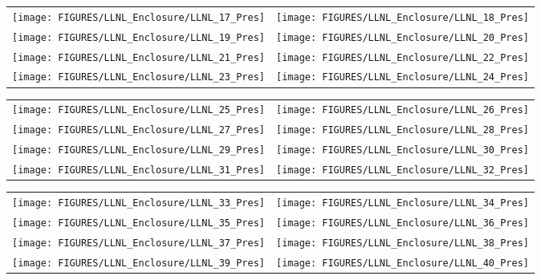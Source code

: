 \begin{figure}[p]
\begin{tabular*}{\textwidth}{l@{\extracolsep{\fill}}r}
\texttt{[image: FIGURES/LLNL\_Enclosure/LLNL\_17\_Pres]} &
\texttt{[image: FIGURES/LLNL\_Enclosure/LLNL\_18\_Pres]} \\
\texttt{[image: FIGURES/LLNL\_Enclosure/LLNL\_19\_Pres]} &
\texttt{[image: FIGURES/LLNL\_Enclosure/LLNL\_20\_Pres]} \\
\texttt{[image: FIGURES/LLNL\_Enclosure/LLNL\_21\_Pres]} &
\texttt{[image: FIGURES/LLNL\_Enclosure/LLNL\_22\_Pres]} \\
\texttt{[image: FIGURES/LLNL\_Enclosure/LLNL\_23\_Pres]} &
\texttt{[image: FIGURES/LLNL\_Enclosure/LLNL\_24\_Pres]}
\end{tabular*}
\label{LLNL_Enclosure_Pres_3}
\end{figure}

\begin{figure}[p]
\begin{tabular*}{\textwidth}{l@{\extracolsep{\fill}}r}
\texttt{[image: FIGURES/LLNL\_Enclosure/LLNL\_25\_Pres]} &
\texttt{[image: FIGURES/LLNL\_Enclosure/LLNL\_26\_Pres]} \\
\texttt{[image: FIGURES/LLNL\_Enclosure/LLNL\_27\_Pres]} &
\texttt{[image: FIGURES/LLNL\_Enclosure/LLNL\_28\_Pres]} \\
\texttt{[image: FIGURES/LLNL\_Enclosure/LLNL\_29\_Pres]} &
\texttt{[image: FIGURES/LLNL\_Enclosure/LLNL\_30\_Pres]} \\
\texttt{[image: FIGURES/LLNL\_Enclosure/LLNL\_31\_Pres]} &
\texttt{[image: FIGURES/LLNL\_Enclosure/LLNL\_32\_Pres]}
\end{tabular*}
\label{LLNL_Enclosure_Pres_4}
\end{figure}

\begin{figure}[p]
\begin{tabular*}{\textwidth}{l@{\extracolsep{\fill}}r}
\texttt{[image: FIGURES/LLNL\_Enclosure/LLNL\_33\_Pres]} &
\texttt{[image: FIGURES/LLNL\_Enclosure/LLNL\_34\_Pres]} \\
\texttt{[image: FIGURES/LLNL\_Enclosure/LLNL\_35\_Pres]} &
\texttt{[image: FIGURES/LLNL\_Enclosure/LLNL\_36\_Pres]} \\
\texttt{[image: FIGURES/LLNL\_Enclosure/LLNL\_37\_Pres]} &
\texttt{[image: FIGURES/LLNL\_Enclosure/LLNL\_38\_Pres]} \\
\texttt{[image: FIGURES/LLNL\_Enclosure/LLNL\_39\_Pres]} &
\texttt{[image: FIGURES/LLNL\_Enclosure/LLNL\_40\_Pres]}
\end{tabular*}
\label{LLNL_Enclosure_Pres_5}
\end{figure}

